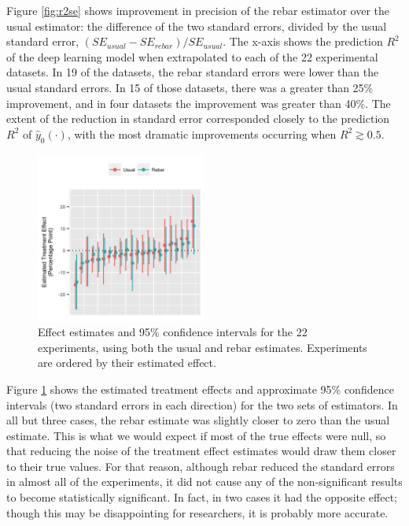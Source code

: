 \documentclass{edm_template}
\newcommand{\model}{\hat{y}_0(\cdot)}
\begin{document}
Figure \ref{fig:r2se} shows improvement in precision of the rebar estimator over the usual estimator: the difference of the two standard errors, divided by the usual standard error, $(SE_{usual}-SE_{rebar})/SE_{usual}$.
The x-axis shows the prediction $R^2$ of the deep learning model when extrapolated to each of the 22 experimental datasets. 
In 19 of the datasets, the rebar standard errors were lower than the usual standard errors. 
In 15 of those datasets, there was a greater than 25\% improvement, and in four datasets the improvement was greater than 40\%.
The extent of the reduction in standard error corresponded closely to the prediction $R^2$ of $\model$, with the most dramatic improvements occurring when $R^2\gtrsim 0.5$.

\begin{figure}
\centering
\includegraphics[width=0.5\textwidth]{estEff1.jpg}
\caption{Effect estimates and 95\% confidence intervals for the 22 experiments, using both the usual and rebar estimates. Experiments are ordered by their estimated effect.}
\label{fig:estEff1}
\end{figure}


Figure \ref{fig:estEff1} shows the estimated treatment effects and approximate 95\% confidence intervals (two standard errors in each direction) for the two sets of estimators. 
In all but three cases, the rebar estimate was slightly closer to zero than the usual estimate.
This is what we would expect if most of the true effects were null, so that reducing the noise of the treatment effect estimates would draw them closer to their true values. 
For that reason, although rebar reduced the standard errors in almost all of the experiments, it did not cause any of the non-significant results to become statistically significant. 
In fact, in two cases it had the opposite effect; though this may be disappointing for researchers, it is probably more accurate. 
\end{document}
